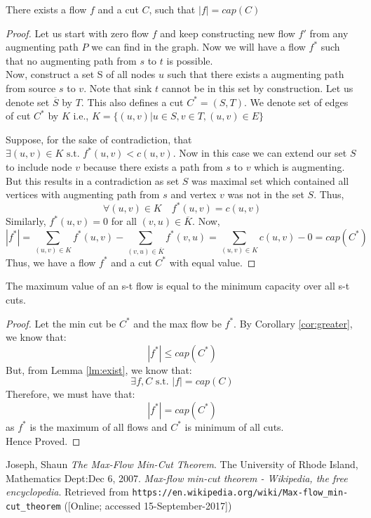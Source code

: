 \documentclass[11pt,a4paper]{article}
\begin{document}
    \begin{lm}\label{lm:exist} There exists a flow $f$ and a cut $C$, such that $|f| = cap(C)$\end{lm}
    \begin{proof} Let us start with zero flow $f$ and keep constructing new flow $f'$ from any augmenting path $P$ we can
    find in the graph. Now we will have a flow $f^{*}$ such that no augmenting path from $s$ to $t$ is possible.\\
    Now, construct a set S of all nodes $u$ such that there exists a augmenting path from source $s$ to $v$. Note that sink $t$
    cannot be in this set by construction. Let us denote set $\overline{S}$ by $T$. This also defines a cut $C^* = (S,T)$. We
    denote set of edges of cut $C^*$ by $K$ i.e., $K = \{(u,v)| u\in S,v\in T, (u,v) \in E\}$

    Suppose, for the sake of contradiction, that $\exists (u,v)\in K \text{ s.t. }f^*(u,v) < c(u,v)$. Now in this case we can
    extend our set $S$ to include node $v$ because there exists a path from $s$ to $v$ which is augmenting. But this results in
    a contradiction as set $S$ was maximal set which contained all vertices with augmenting path from $s$ and vertex $v$ was not
    in the set $S$. Thus,
    $$ \forall (u,v) \in K \quad f^*(u,v) = c(u,v) $$
    Similarly, $f^*(u,v) = 0$ for all $(v,u) \in \overline{K}$. Now,
    $$
    |f^*| = \sum_{(u,v)\in K}f^*(u,v) - \sum_{(v,u)\in \overline{K}}f^*(v,u) = \sum_{(u,v)\in K}c(u,v) - 0 = cap(C^*)
    $$
    Thus, we have a flow $f^*$ and a cut $C^*$ with equal value.
    \end{proof}
    \begin{thm} The maximum value of an s-t flow is equal to the minimum capacity over all s-t cuts.\end{thm}
        \begin{proof} Let the min cut be $C^*$ and the max flow be $f^*$. By Corollary \ref{cor:greater}, we know that:
    $$|f^*| \leq cap(C^*)$$
            But, from Lemma \ref{lm:exist}, we know that:
    $$\exists f,C \text{ s.t. } |f| = cap(C)$$
    Therefore, we must have that:
    $$|f^*| = cap(C^*)$$
    as $f^*$ is the maximum of all flows and $C^*$ is minimum of all cuts.\\
    Hence Proved.
    \end{proof}

\begin{thebibliography}{9}
    Joseph, Shaun
  \textit{The Max-Flow Min-Cut Theorem}.
  The University of Rhode Island, Mathematics Dept:Dec 6, 2007.
      \textit{Max-flow min-cut theorem - Wikipedia, the free encyclopedia}. Retrieved from \texttt{https://en.wikipedia.org/wiki/Max-flow\_min-cut\_theorem} ([Online; accessed 15-September-2017])

\end{thebibliography}
\end{document}
